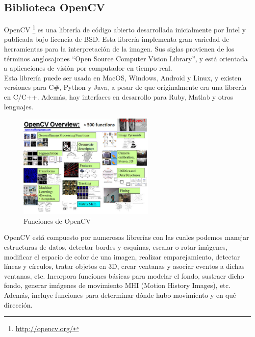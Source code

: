 \subsection{Biblioteca OpenCV}

OpenCV \footnote{\url{http://opencv.org/}} es una librería de código abierto desarrollada inicialmente por Intel y publicada bajo licencia de BSD. Esta librería implementa gran variedad de herramientas para la interpretación de la imagen. Sus siglas provienen de los términos anglosajones ``Open Source Computer Vision Library'', y está orientada a aplicaciones de visión por computador en tiempo real. \\

Esta librería puede ser usada en MacOS, Windows, Android y Linux, y existen versiones para C\#, Python y Java, a pesar de que originalmente era una librería en C/C++. Además, hay interfaces en desarrollo para Ruby, Matlab y otros lenguajes.\\

\begin{figure}[H]
  \begin{center}
    \includegraphics[width=0.6\textwidth]{figures/Estado_arte/opencv.png}
		\caption{Funciones de OpenCV}
		\label{fig.opencv}
		\end{center}
\end{figure}

OpenCV está compuesto por numerosas librerías con las cuales podemos manejar estructuras de datos, detectar bordes y esquinas, escalar o rotar imágenes, modificar el espacio de color de una imagen, realizar emparejamiento, detectar líneas y círculos, tratar objetos en 3D, crear ventanas y asociar eventos a dichas ventanas, etc. Incorpora funciones básicas para modelar el fondo, sustraer dicho fondo, generar imágenes de movimiento MHI (Motion History Images), etc. Además, incluye funciones para determinar dónde hubo movimiento y en qué dirección. \\


